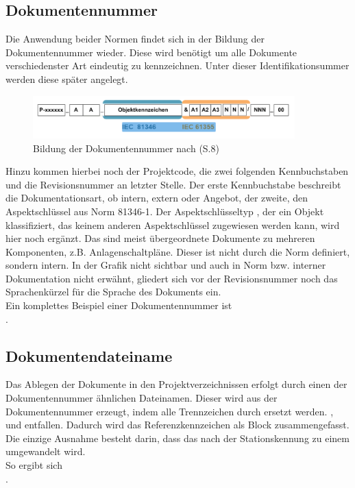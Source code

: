 \subsection{Dokumentennummer}
\label{sub:dokunummer}
Die Anwendung beider Normen findet sich in der Bildung der Dokumentennummer wieder. Diese wird benötigt um alle Dokumente verschiedenster Art eindeutig zu kennzeichnen. Unter dieser Identifikationsummer werden diese später angelegt.
\\
\begin{figure}[H]
   \begin{center}
   \includegraphics[width=0.9\textwidth]{Bilder/referenzkennzeichen} 
   \caption{Bildung der Dokumentennummer nach \cite{5}(S.8)} 
   \label{fig:doknum} 
   \end{center}
\end{figure}

Hinzu kommen hierbei noch der Projektcode, die zwei folgenden Kennbuchstaben und die Revisionsnummer an letzter Stelle. Der erste Kennbuchstabe beschreibt die Dokumentationsart, ob intern, extern oder Angebot, der zweite, den Aspektschlüssel aus Norm 81346-1.
\newpage
Der Aspektschlüsseltyp , der ein Objekt klassifiziert, das keinem anderen Aspektschlüssel zugewiesen werden kann, wird hier noch ergänzt. Das sind meist übergeordnete Dokumente zu mehreren Komponenten, z.B. Anlagenschaltpläne. Dieser ist nicht durch die Norm definiert, sondern intern. 
In der Grafik nicht sichtbar und auch in Norm bzw. interner Dokumentation nicht erwähnt, gliedert sich vor der Revisionsnummer noch das Sprachenkürzel für die Sprache des Dokuments ein.\\
Ein komplettes Beispiel einer Dokumentennummer ist \\
.
\subsection{Dokumentendateiname}
\label{sub:dokudatei}
Das Ablegen der Dokumente in den Projektverzeichnissen erfolgt durch einen der Dokumentennummer ähnlichen Dateinamen. Dieser wird aus der Dokumentennummer erzeugt, indem alle Trennzeichen durch \markss{\_} ersetzt werden. \markss{-}, \markss{+} und \markss{=} entfallen. Dadurch wird das Referenzkennzeichen als Block zusammengefasst. Die einzige Ausnahme besteht darin, dass das \markss{-} nach der Stationskennung zu einem \markss{\_} umgewandelt wird.\\
So ergibt sich \\
.
\newpage
